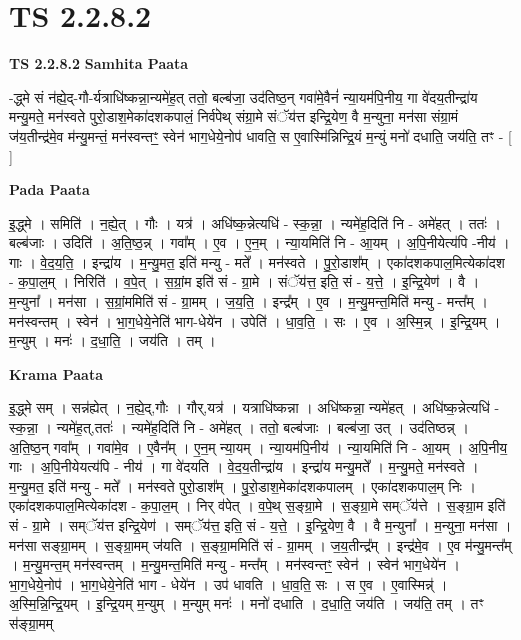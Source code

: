 \documentclass[17pt]{extarticle}
\begin{document}
\section*{ TS 2.2.8.2 }

\textbf{TS 2.2.8.2 } \newline
\textbf{Samhita Paata} \newline

-द्ध्मे सं न॑ह्ये॒द्-गौ-र्यत्राधि॑ष्कन्ना॒न्यमे॑ह॒त् ततो॒ बल्ब॑जा॒ उद॑तिष्ठ॒न् गवा॑मे॒वैनं॑ न्या॒यम॑पि॒नीय॒ गा वे॑दय॒तीन्द्रा॑य मन्यु॒मते॒ मन॑स्वते पुरो॒डाश॒मेका॑दशकपालं॒ निर्व॑पेथ् संग्रा॒मे संॅय॑त्त इन्द्रि॒येण॒ वै म॒न्युना॒ मन॑सा संग्रा॒मं ज॑य॒तीन्द्र॑मे॒व म॑न्यु॒मन्तं॒ मन॑स्वन्तꣳ॒॒ स्वेन॑ भाग॒धेये॒नोप॑ धावति॒ स ए॒वास्मि॑न्निन्द्रि॒यं म॒न्युं मनो॑ दधाति॒ जय॑ति॒ तꣳ - [  ] \newline

\textbf{Pada Paata} \newline

इ॒द्ध्मे । समिति॑ । न॒ह्ये॒त् । गौः । यत्र॑ । अधि॑ष्क॒न्नेत्यधि॑ - स्क॒न्ना॒ । न्यमे॑ह॒दिति॑ नि - अमे॑हत् । ततः॑ । बल्ब॑जाः । उदिति॑ । अ॒ति॒ष्ठ॒न्न् । गवा᳚म् । ए॒व । ए॒न॒म् । न्या॒यमिति॑ नि - आ॒यम् । अ॒पि॒नीयेत्य॑पि -नीय॑ । गाः । वे॒द॒य॒ति॒ । इन्द्रा॑य । म॒न्यु॒मत॒ इति॑ मन्यु - मते᳚ । मन॑स्वते । पु॒रो॒डाश᳚म् । एका॑दशकपाल॒मित्येका॑दश - क॒पा॒ल॒म् । निरिति॑ । व॒पे॒त् । स॒ग्रां॒म इति॑ सं - ग्रा॒मे । संॅय॑त्त॒ इति॒ सं - य॒त्ते॒ । इ॒न्द्रि॒येण॑ । वै । म॒न्युना᳚ । मन॑सा । स॒ग्रां॒ममिति॑ सं - ग्रा॒मम् । ज॒य॒ति॒ । इन्द्र᳚म् । ए॒व । म॒न्यु॒मन्त॒मिति॑ मन्यु - मन्त᳚म् । मन॑स्वन्तम् । स्वेन॑ । भा॒ग॒धेये॒नेति॑ भाग-धेये॑न । उपेति॑ । धा॒व॒ति॒ । सः । ए॒व । अ॒स्मि॒न्न् । इ॒न्द्रि॒यम् । म॒न्युम् । मनः॑ । द॒धा॒ति॒ । जय॑ति । तम् ।  \newline


\textbf{Krama Paata} \newline

इ॒द्ध्मे सम् । सन्न॑ह्येत् । न॒ह्ये॒द्,गौः । गौर्,यत्र॑ । यत्राधि॑ष्कन्ना । अधि॑ष्कन्ना॒ न्यमे॑हत् । अधि॑ष्क॒न्नेत्यधि॑ - स्क॒न्ना॒ । न्यमे॑ह॒त्,ततः॑ । न्यमे॑ह॒दिति॑ नि - अमे॑हत् । ततो॒ बल्ब॑जाः । बल्ब॑जा॒ उत् । उद॑तिष्ठन्न् । अ॒ति॒ष्ठ॒न् गवा᳚म् । गवा॑मे॒व । ए॒वैन᳚म् । ए॒न॒म् न्या॒यम् । न्या॒यम॑पि॒नीय॑ । न्या॒यमिति॑ नि - आ॒यम् । अ॒पि॒नीय॒ गाः । अ॒पि॒नीयेयत्य॑पि - नीय॑ । गा वे॑दयति । वे॒द॒य॒तीन्द्रा॑य । इन्द्रा॑य मन्यु॒मते᳚ । म॒न्यु॒मते॒ मन॑स्वते । म॒न्यु॒मत॒ इति॑ मन्यु - मते᳚ । मन॑स्वते पुरो॒डाश᳚म् । पु॒रो॒डाश॒मेका॑दशकपालम् । एका॑दशकपाल॒म् निः । एका॑दशकपाल॒मित्येका॑दश - क॒पा॒ल॒म् । निर् व॑पेत् । व॒पे॒थ् स॒ङ्ग्रा॒मे । स॒ङ्ग्रा॒मे सम्ॅय॑त्ते । स॒ङ्ग्रा॒म इति॑ सं - ग्रा॒मे । सम्ॅय॑त्त इन्द्रि॒येण॑ । सम्ॅय॑त्त॒ इति॒ सं - य॒त्ते॒ । इ॒न्द्रि॒येण॒ वै । वै म॒न्युना᳚ । म॒न्युना॒ मन॑सा । मन॑सा सङ्ग्रा॒मम् । स॒ङ्ग्रा॒मम् ज॑यति । स॒ङ्ग्रा॒ममिति॑ सं - ग्रा॒मम् । ज॒य॒तीन्द्र᳚म् । इन्द्र॑मे॒व । ए॒व म॑न्यु॒मन्त᳚म् । म॒न्यु॒मन्त॒म् मन॑स्वन्तम् । म॒न्यु॒मन्त॒मिति॑ मन्यु - मन्त᳚म् । मन॑स्वन्तꣳ॒॒ स्वेन॑ । स्वेन॑ भाग॒धेये॑न । भा॒ग॒धेये॒नोप॑ । भा॒ग॒धेये॒नेति॑ भाग - धेये॑न । उप॑ धावति । धा॒व॒ति॒ सः । स ए॒व । ए॒वास्मिन्न्॑ । अ॒स्मि॒न्नि॒न्द्रि॒यम् । इ॒न्द्रि॒यम् म॒न्युम् । म॒न्युम् मनः॑ । मनो॑ दधाति । द॒धा॒ति॒ जय॑ति । जय॑ति॒ तम् । तꣳ स॑ङ्ग्रा॒मम् \newline
\end{document}
